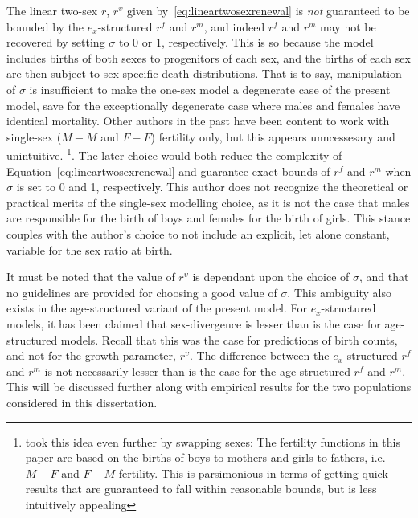 The linear two-sex $r$, $r^\upsilon$ given by~\eqref{eq:lineartwosexrenewal} is
\textit{not} guaranteed to be bounded by the $e_x$-structured $r^f$ and $r^m$,
and indeed $r^f$ and $r^m$ may not be recovered by setting $\sigma$ to 0 or 1,
respectively. This is so because the model includes births of both sexes to
progenitors of each sex, and the births of each sex are then subject to
sex-specific death distributions. That is to say, manipulation of $\sigma$ is
insufficient to make the one-sex model a degenerate case of the present model, save for the
exceptionally degenerate case where males and females have identical mortality.
Other authors in the past have been content to work with single-sex ($M-M$ and
$F-F$) fertility only, but this appears unncessesary and unintuitive.
\footnote{\citet{pollard1948measurement} took this idea even further by swapping
sexes: The fertility functions in this paper are based on the births of boys to mothers 
and girls to fathers, i.e. $M-F$ and $F-M$ fertility. This is parsimonious 
in terms of getting quick results that are guaranteed to fall within reasonable bounds, but is less
intuitively appealing}. The later choice would both reduce the complexity of
Equation~\ref{eq:lineartwosexrenewal} and guarantee exact bounds of $r^f$ and $r^m$ 
when $\sigma$ is set to 0 and 1, respectively. This author does not recognize 
the theoretical or practical merits of the single-sex modelling choice, as it 
is not the case that males are responsible for the birth of boys and females 
for the birth of girls. This stance couples with the author's choice to not
include an explicit, let alone constant, variable for the sex ratio at birth.

It must be
noted that the value of $r^\upsilon$ is dependant upon the choice of $\sigma$, and that no guidelines are provided for choosing a good value of $\sigma$. This ambiguity also exists in the age-structured variant of the present model. For $e_x$-structured models, it has been claimed that sex-divergence is lesser than is the case for
age-structured models. Recall that this was the case for predictions of birth
counts, and not for the growth parameter, $r^\upsilon$. The
difference between the $e_x$-structured $r^f$ and $r^m$ is not necessarily lesser than is the case for
the age-structured $r^f$ and $r^m$. This will be discussed further along with
empirical results for the two populations considered in this dissertation.

